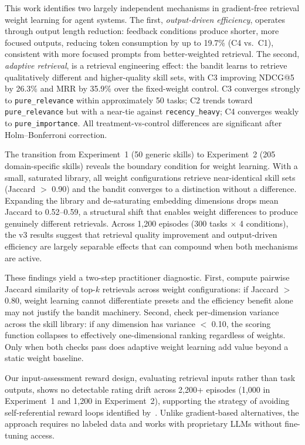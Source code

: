 
This work identifies two largely independent mechanisms in gradient-free retrieval weight learning for agent systems.
The first, \emph{output-driven efficiency}, operates through output length reduction: feedback conditions produce shorter, more focused outputs, reducing token consumption by up to 19.7\% (C4 vs.\ C1), consistent with more focused prompts from better-weighted retrieval.
The second, \emph{adaptive retrieval}, is a retrieval engineering effect: the bandit learns to retrieve qualitatively different and higher-quality skill sets, with C3 improving NDCG@5 by 26.3\% and MRR by 35.9\% over the fixed-weight control.
C3 converges strongly to \texttt{pure\_relevance} within approximately 50 tasks; C2 trends toward \texttt{pure\_relevance} but with a near-tie against \texttt{recency\_heavy}; C4 converges weakly to \texttt{pure\_importance}.
All treatment-vs-control differences are significant after Holm--Bonferroni correction.

The transition from Experiment~1 (50 generic skills) to Experiment~2 (205 domain-specific skills) reveals the boundary condition for weight learning.
With a small, saturated library, all weight configurations retrieve near-identical skill sets (Jaccard $>$ 0.90) and the bandit converges to a distinction without a difference.
Expanding the library and de-saturating embedding dimensions drops mean Jaccard to 0.52--0.59, a structural shift that enables weight differences to produce genuinely different retrievals.
Across 1,200 episodes (300 tasks $\times$ 4 conditions), the v3 results suggest that retrieval quality improvement and output-driven efficiency are largely separable effects that can compound when both mechanisms are active.

These findings yield a two-step practitioner diagnostic.
First, compute pairwise Jaccard similarity of top-$k$ retrievals across weight configurations: if Jaccard $>$ 0.80, weight learning cannot differentiate presets and the efficiency benefit alone may not justify the bandit machinery.
Second, check per-dimension variance across the skill library: if any dimension has variance $<$ 0.10, the scoring function collapses to effectively one-dimensional ranking regardless of weights.
Only when both checks pass does adaptive weight learning add value beyond a static weight baseline.

Our input-assessment reward design, evaluating retrieval inputs rather than task outputs, shows no detectable rating drift across 2{,}200+ episodes (1,000 in Experiment~1 and 1,200 in Experiment~2), supporting the strategy of avoiding self-referential reward loops identified by~\citet{pan2024feedback}.
Unlike gradient-based alternatives, the approach requires no labeled data and works with proprietary LLMs without fine-tuning access.

